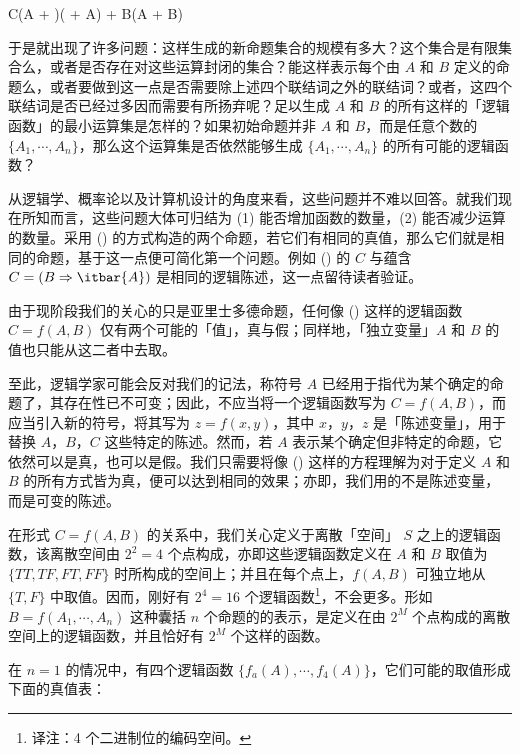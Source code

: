 \placeformula[1-15]
\startformula
C\equiv (A + )( + A) + B(A + B)
\stopformula

于是就出现了许多问题：这样生成的新命题集合的规模有多大？这个集合是有限集合么，或者是否存在对这些运算封闭的集合？能这样表示每个由 $A$ 和 $B$ 定义的命题么，或者要做到这一点是否需要除上述四个联结词之外的联结词？或者，这四个联结词是否已经过多因而需要有所扬弃呢？足以生成 $A$ 和 $B$ 的所有这样的「逻辑函数」的最小运算集是怎样的？如果初始命题并非 $A$ 和 $B$，而是任意个数的 $\{A_1,\cdots,A_n\}$，那么这个运算集是否依然能够生成 $\{A_1,\cdots,A_n\}$ 的所有可能的逻辑函数？

从逻辑学、概率论以及计算机设计的角度来看，这些问题并不难以回答。就我们现在所知而言，这些问题大体可归结为 (1) 能否增加函数的数量，(2) 能否减少运算的数量。采用 (\in[1-15]) 的方式构造的两个命题，若它们有相同的真值，那么它们就是相同的命题，基于这一点便可简化第一个问题。例如 (\in[1-15]) 的 $C$ 与蕴含 $C = (B\Rightarrow \itbar{A})$ 是相同的逻辑陈述，这一点留待读者验证。

由于现阶段我们的关心的只是亚里士多德命题，任何像 (\in[1-15]) 这样的逻辑函数 $C = f(A, B)$ 仅有两个可能的「值」，真与假；同样地，「独立变量」$A$ 和 $B$ 的值也只能从这二者中去取。

至此，逻辑学家可能会反对我们的记法，称符号 $A$ 已经用于指代为某个确定的命题了，其存在性已不可变；因此，不应当将一个逻辑函数写为 $C = f(A, B)$，而应当引入新的符号，将其写为 $z = f(x, y)$，其中 $x$，$y$，$z$ 是「陈述变量」，用于替换 $A$，$B$，$C$ 这些特定的陈述。然而，若 $A$ 表示某个确定但非特定的命题，它依然可以是真，也可以是假。我们只需要将像 (\in[1-15]) 这样的方程理解为对于定义 $A$ 和 $B$ 的所有方式皆为真，便可以达到相同的效果；亦即，我们用的不是陈述变量，而是可变的陈述。

在形式 $C = f(A, B)$ 的关系中，我们关心定义于离散「空间」 $S$ 之上的逻辑函数，该离散空间由 $2^2 = 4$ 个点构成，亦即这些逻辑函数定义在 $A$ 和 $B$ 取值为 $\{TT, TF, FT, FF\}$ 时所构成的空间上；并且在每个点上，$f(A, B)$ 可独立地从 $\{T,F\}$ 中取值。因而，刚好有 $2^4 = 16$ 个逻辑函数\footnote{译注：4 个二进制位的编码空间。}，不会更多。形如 $B = f(A_1, \cdots, A_n)$ 这种囊括 $n$ 个命题的的表示，是定义在由 $2^M$ 个点构成的离散空间上的逻辑函数，并且恰好有 $2^M$ 个这样的函数。

在 $n = 1$ 的情况中，有四个逻辑函数 $\{f_a(A),\cdots,f_4(A)\}$，它们可能的取值形成下面的真值表：


